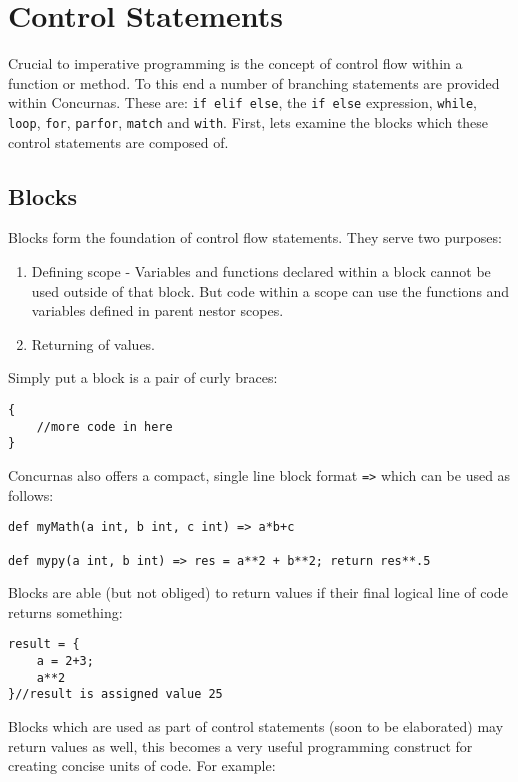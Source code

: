 \documentclass[conc-doc]{subfiles}
\begin{document}
	
	\chapter[Control Statements]{Control Statements}
Crucial to imperative programming is the concept of control flow within a function or method. To this end a number of branching statements are provided within Concurnas. These are: \lstinline{if elif else}, the \lstinline{if else} expression, \lstinline{while}, \lstinline{loop}, \lstinline{for}, \lstinline{parfor}, \lstinline{match} and \lstinline{with}. First, lets examine the blocks which these control statements are composed of.

\section{Blocks}
Blocks form the foundation of control flow statements. They serve two purposes: 

\begin{enumerate}
	\item Defining scope - Variables and functions declared within a block cannot be used outside of that block. But code within a scope can use the functions and variables defined in parent nestor scopes.
	\item Returning of values.
\end{enumerate}


Simply put a block is a pair of curly braces:
\begin{lstlisting}
{
	//more code in here	
}
\end{lstlisting}

Concurnas also offers a compact, single line block format \lstinline{=>} which can be used as follows:
\begin{lstlisting}
def myMath(a int, b int, c int) => a*b+c

def mypy(a int, b int) => res = a**2 + b**2; return res**.5
\end{lstlisting}

Blocks are able (but not obliged) to return values if their final logical line of code returns something:

\begin{lstlisting}
result = {
	a = 2+3; 
	a**2
}//result is assigned value 25
\end{lstlisting}

Blocks which are used as part of control statements (soon to be elaborated) may return values as well, this becomes a very useful programming construct for creating concise units of code. For example:
\end{document}
